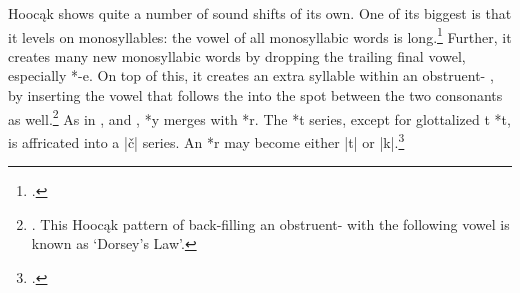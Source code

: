 \documentclass[output=paper]{LSP/langsci}
\begin{document}
Hooc\k{a}k shows quite a number of sound shifts of its own.  One of its biggest is that it levels  on monosyllables: the vowel of all monosyllabic words is long.\footnote{\citealt[303, 797]{Rankinetal2006PDF}.} Further, it creates many new monosyllabic words by dropping the trailing final vowel, especially *-e.  On top of this, it creates an extra syllable within an obstruent- , by inserting the vowel that follows the  into the spot between the two consonants as well.\footnote{\citet[123--124]{Helmbrecht2011}. This Hooc\k{a}k pattern of back-filling an obstruent-  with the following vowel is known as `Dorsey's Law'.}  As in ,  and ,  *y merges with *r.  The *t series, except for glottalized t *t\textsuperscript{}, is affricated into a |\v{c}| series.  An *r\textsuperscript{}  may become either |t\textsuperscript{}| or |k\textsuperscript{}|.\footnote{\citealt[816-817]{Rankinetal2006PDF}.}
\end{document}
